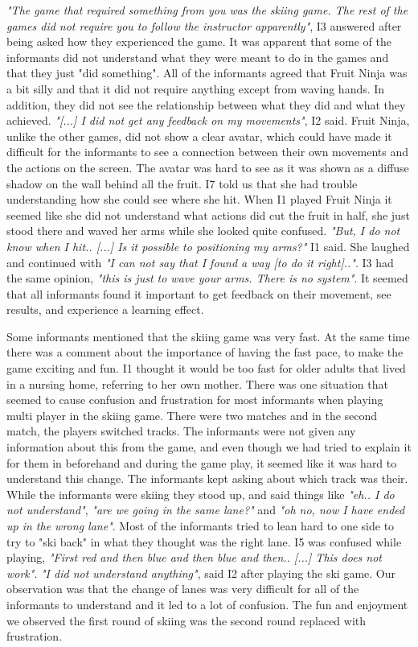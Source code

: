 \emph{"The game that required something from you was the skiing game. The rest of the games did not require you to follow the instructor apparently"}, I3 answered after being asked how they experienced the game. It was apparent that some of the informants did not understand what they were meant to do in the games and that they just "did something". All of the informants agreed that Fruit Ninja was a bit silly and that it did not require anything except from waving hands. In addition, they did not see the relationship between what they did and what they achieved. \emph{"[...] I did not get any feedback on my movements"}, I2 said. Fruit Ninja, unlike the other games, did not show a clear avatar, which could have made it difficult for the informants to see a connection between their own movements and the actions on the screen. The avatar was hard to see as it was shown as a diffuse shadow on the wall behind all the fruit. I7 told us that she had trouble understanding how she could see where she hit. When I1 played Fruit Ninja it seemed like she did not understand what actions did cut the fruit in half, she just stood there and waved her arms while she looked quite confused. \emph{"But, I do not know when I hit.. [...] Is it possible to positioning my arms?"} I1 said. She laughed and continued with \emph{"I can not say that I found a way [to do it right].."}. I3 had the same opinion, \emph{"this is just to wave your arms. There is no system"}. It seemed that all informants found it important to get feedback on their movement, see results, and experience a learning effect. 

Some informants mentioned that the skiing game was very fast. At the same time there was a comment about the importance of having the fast pace, to make the game exciting and fun. I1 thought it would be too fast for older adults that lived in a nursing home, referring to her own mother. There was one situation that seemed to cause confusion and frustration for most informants when playing multi player in the skiing game. There were two matches and in the second match, the players switched tracks. The informants were not given any information about this from the game, and even though we had tried to explain it for them in beforehand and during the game play, it seemed like it was hard to understand this change. The informants kept asking about which track was their. While the informants were skiing they stood up, and said things like \emph{"eh.. I do not understand"}, \emph{"are we going in the same lane?"} and \emph{"oh no, now I have ended up in the wrong lane"}. Most of the informants tried to lean hard to one side to try to "ski back" in what they thought was the right lane. I5 was confused while playing, \emph{"First red and then blue and then blue and then.. [...] This does not work"}. \emph{"I did not understand anything"}, said I2 after playing the ski game. Our observation was that the change of lanes was very difficult for all of the informants to understand and it led to a lot of confusion. The fun and enjoyment we observed the first round of skiing was the second round replaced with frustration. 

